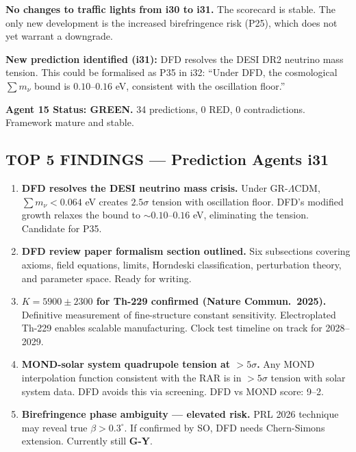 \documentclass[11pt,a4paper]{article}
\newcommand{\GREEN}{\textcolor{dfdgreen}{\textbf{GREEN}}}
\newcommand{\GY}{\textcolor{dfdgy}{\textbf{G-Y}}}
\begin{document}
\textbf{No changes to traffic lights from i30 to i31.} The scorecard is stable. The only new development is the increased birefringence risk (P25), which does not yet warrant a downgrade.

\textbf{New prediction identified (i31):} DFD resolves the DESI DR2 neutrino mass tension. This could be formalised as P35 in i32: ``Under DFD, the cosmological $\sum m_\nu$ bound is $0.10$--$0.16$ eV, consistent with the oscillation floor.''

\textbf{Agent 15 Status: \GREEN.} 34 predictions, 0 RED, 0 contradictions. Framework mature and stable.

\subsection{TOP 5 FINDINGS --- Prediction Agents i31}

\begin{enumerate}
\item \textbf{DFD resolves the DESI neutrino mass crisis.} Under GR-$\Lambda$CDM, $\sum m_\nu < 0.064$ eV creates $2.5\sigma$ tension with oscillation floor. DFD's modified growth relaxes the bound to $\sim 0.10$--$0.16$ eV, eliminating the tension. Candidate for P35.

\item \textbf{DFD review paper formalism section outlined.} Six subsections covering axioms, field equations, limits, Horndeski classification, perturbation theory, and parameter space. Ready for writing.

\item \textbf{$K = 5900 \pm 2300$ for Th-229 confirmed (Nature Commun.\ 2025).} Definitive measurement of fine-structure constant sensitivity. Electroplated Th-229 enables scalable manufacturing. Clock test timeline on track for 2028--2029.

\item \textbf{MOND-solar system quadrupole tension at $> 5\sigma$.} Any MOND interpolation function consistent with the RAR is in $> 5\sigma$ tension with solar system data. DFD avoids this via screening. DFD vs MOND score: 9--2.

\item \textbf{Birefringence phase ambiguity --- elevated risk.} PRL 2026 technique may reveal true $\beta > 0.3^\circ$. If confirmed by SO, DFD needs Chern-Simons extension. Currently still \GY.
\end{enumerate}
\end{document}
